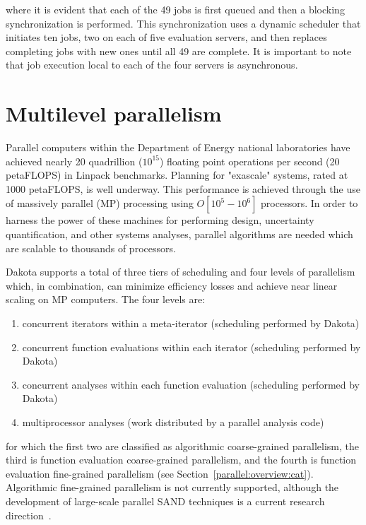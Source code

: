 where it is evident that each of the 49 jobs is first queued and then
a blocking synchronization is performed.  This synchronization uses a
dynamic scheduler that initiates ten jobs, two on each of five evaluation
servers, and then replaces completing jobs with new
ones until all 49 are complete.  It is important to note that job
execution local to each of the four servers is asynchronous.

\section{Multilevel parallelism} \label{parallel:MLP}


Parallel computers within the Department of Energy national
laboratories have achieved nearly 20 quadrillion ($10^{15}$) floating point
operations per second (20 petaFLOPS) in Linpack benchmarks. Planning
for "exascale" systems, rated at 1000 petaFLOPS, is well underway. 
This performance is achieved through the use of massively parallel (MP)
processing using $O[10^{5}-10^{6}]$ processors. In order to harness
the power of these machines for performing design, uncertainty
quantification, and other systems analyses, parallel algorithms are
needed which are scalable to thousands of processors.

Dakota supports a total of three tiers of scheduling and four levels
of parallelism which, in combination, can minimize efficiency losses
and achieve near linear scaling on MP computers. The four levels are:
\begin{enumerate}
\item concurrent iterators within a meta-iterator (scheduling performed by
  Dakota)

\item concurrent function evaluations within each iterator (scheduling
  performed by Dakota)

\item concurrent analyses within each function evaluation (scheduling
  performed by Dakota)

\item multiprocessor analyses (work distributed by a parallel
  analysis code)
\end{enumerate}
for which the first two are classified as algorithmic coarse-grained
parallelism, the third is function evaluation coarse-grained
parallelism, and the fourth is function evaluation fine-grained
parallelism (see Section~\ref{parallel:overview:cat}). Algorithmic
fine-grained parallelism is not currently supported, although the
development of large-scale parallel SAND techniques is a current
research direction~\cite{Bar01b}.

